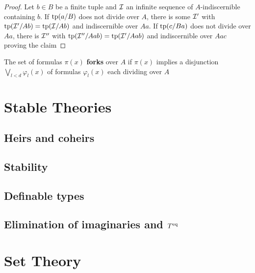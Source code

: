 \documentclass[11pt]{article}
\begin{document}
\begin{proof}
Let \(b\in B\) be a finite tuple and \(\mathcal{I}\) an infinite sequence of \(A\)-indiscernible
containing \(b\). If \(\operatorname{tp}(a/B)\) does not divide over \(A\), there is some \(\mathcal{I}'\)
with \(\operatorname{tp}(\mathcal{I}'/Ab)=\operatorname{tp}(\mathcal{I}/Ab)\) and indiscernible over \(Aa\). If \(\operatorname{tp}(c/Ba)\) does not divide
over \(Aa\), there is \(\mathcal{I}''\) with \(\operatorname{tp}(\mathcal{I}''/Aab)=\operatorname{tp}(\mathcal{I}'/Aab)\) and indiscernible over \(Aac\)
proving the claim
\end{proof}

\begin{theorem}[]
The set of formulas \(\pi(x)\) \textbf{forks} over \(A\) if \(\pi(x)\) implies a
disjunction \(\bigvee_{l<d}\varphi_l(x)\) of formulas \(\varphi_l(x)\) each dividing over \(A\)
\end{theorem}



\section{Stable Theories}
\label{sec:orgf1991c5}
\subsection{Heirs and coheirs}
\label{sec:org1d7e6b4}
\subsection{Stability}
\label{sec:orgda898e0}
\subsection{Definable types}
\label{sec:orgfc3d677}
\subsection{Elimination of imaginaries and \texorpdfstring{\(T^{\operatorname{eq}}\)}{Teq}}
\label{sec:orgf25ade3}





\appendix
\section{Set Theory}
\label{sec:orgd644a38}
\end{document}
